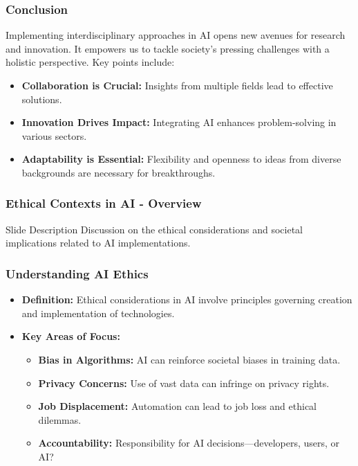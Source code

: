 \documentclass[aspectratio=169]{beamer}
\begin{document}
\begin{frame}
    \frametitle{Conclusion}
    Implementing interdisciplinary approaches in AI opens new avenues for research and innovation. It empowers us to tackle society's pressing challenges with a holistic perspective. Key points include:
    \begin{itemize}
        \item \textbf{Collaboration is Crucial:} Insights from multiple fields lead to effective solutions.
        \item \textbf{Innovation Drives Impact:} Integrating AI enhances problem-solving in various sectors.
        \item \textbf{Adaptability is Essential:} Flexibility and openness to ideas from diverse backgrounds are necessary for breakthroughs.
    \end{itemize}
\end{frame}

\begin{frame}[fragile]
    \frametitle{Ethical Contexts in AI - Overview}
    \begin{block}{Slide Description}
        Discussion on the ethical considerations and societal implications related to AI implementations.
    \end{block}
\end{frame}

\begin{frame}[fragile]
    \frametitle{Understanding AI Ethics}
    \begin{itemize}
        \item \textbf{Definition:} Ethical considerations in AI involve principles governing creation and implementation of technologies.
        \item \textbf{Key Areas of Focus:}
            \begin{itemize}
                \item \textbf{Bias in Algorithms:} AI can reinforce societal biases in training data.
                \item \textbf{Privacy Concerns:} Use of vast data can infringe on privacy rights.
                \item \textbf{Job Displacement:} Automation can lead to job loss and ethical dilemmas.
                \item \textbf{Accountability:} Responsibility for AI decisions—developers, users, or AI?
            \end{itemize}
    \end{itemize}
\end{frame}
\end{document}
